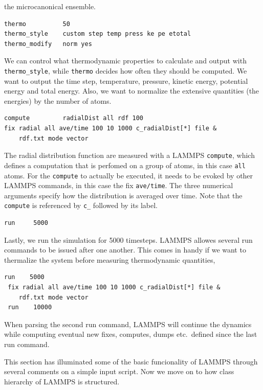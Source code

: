 \documentclass[twoside,english]{uiofysmaster}
\begin{document}
the microcanonical ensemble. 
\begin{lstlisting}[style=lammps]
thermo			50
thermo_style 	custom step temp press ke pe etotal 
thermo_modify 	norm yes
\end{lstlisting}
We can control what thermodynamic properties 
to calculate and output with \texttt{thermo\_style}, while 
\texttt{thermo} decides how often they should be computed. 
We want to output the time step, temperature, 
pressure, kinetic energy, potential energy and total
energy. Also, we want to normalize the extensive
quantities (the energies) by the number of atoms. 
\begin{lstlisting}[style=lammps]
compute 		radialDist all rdf 100
fix radial all ave/time 100 10 1000 c_radialDist[*] file &
    rdf.txt mode vector
\end{lstlisting}
The radial distribution function are measured with a LAMMPS \texttt{compute}, 
which defines a computation that is perfomed on a group of atoms, in this case \texttt{all} atoms. 
For the \texttt{compute} to actually be executed, it needs
to be evoked by other LAMMPS commands, in this case the fix \texttt{ave\slash time}. 
The three numerical arguments specify how the distribution is averaged over time. 
Note that the \texttt{compute} is referenced by \texttt{c\_} followed by its label. 
\begin{lstlisting}[style=lammps]
run		5000
\end{lstlisting}
Lastly, we run the simulation for 5000 timesteps. 
LAMMPS allowes several run commands to be issued
after one another. This comes in handy if we want
to thermalize the system before measuring thermodynamic quantities,
\begin{lstlisting}[style=lammps]
 run 	5000
 fix radial all ave/time 100 10 1000 c_radialDist[*] file &
    rdf.txt mode vector
 run 	10000
\end{lstlisting}
When parsing the second run command, LAMMPS will
continue the dynamics while computing eventual
new fixes, computes, dumps etc.\ defined since
the last run command. 

This section has illuminated some of the basic
funcionality of LAMMPS through several comments
on a simple input script. Now we move on to
how class hierarchy of LAMMPS is structured. 
\end{document}
